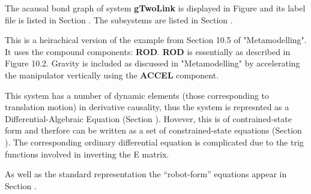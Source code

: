 
%

   The acausal bond graph of system \textbf{gTwoLink} is
   displayed in Figure  and its label
   file is listed in Section .
   The subsystems are listed in Section .

This is a heirachical version of the example from Section 10.5 of
"Metamodelling".  It uses the compound components: {\bf ROD}.  {\bf
ROD} is essentially as described in Figure 10.2.
Gravity is included as discussed in "Metamodelling" by accelerating
the manipulator vertically using the {\bf ACCEL} component.

This system has a number of dynamic elements (those corresponding to
translation motion) in derivative causality, thus the system is
represnted as a Differential-Algebraic Equation (Section
). Hovever, this
is of contrained-state form and therfore can be written as a set of
constrained-state equations (Section ). The
corresponding ordinary differential equation is complicated due to the
trig functions involved in inverting the E matrix.

As well as the standard representation the ``robot-form'' equations
appear in Section  . 

